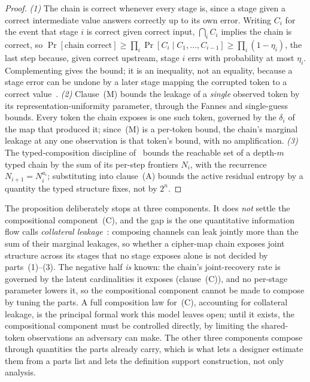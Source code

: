 \documentclass[11pt]{article}
\theoremstyle{definition}
\theoremstyle{plain}
\theoremstyle{remark}
\begin{document}
\begin{proof}
\emph{(1)} The chain is correct whenever every stage is, since a stage given a
correct intermediate value answers correctly up to its own error. Writing $C_i$
for the event that stage $i$ is correct given correct input, $\bigcap_i C_i$
implies the chain is correct, so $\Pr[\text{chain correct}] \ge \prod_{i}
\Pr[C_i \mid C_1, \ldots, C_{i-1}] \ge \prod_{i} (1 - \eta_i)$, the last step
because, given correct upstream, stage $i$ errs with probability at most
$\eta_i$. Complementing gives the bound; it is an inequality, not an equality,
because a stage error can be undone by a later stage mapping the corrupted token
to a correct value~\cite{towell2026cipher}. \emph{(2)} Clause~(M) bounds the
leakage of a \emph{single} observed token by its representation-uniformity
parameter, through the Fannes and single-guess bounds. Every token the chain
exposes is one such token, governed by the $\delta_i$ of the map that produced
it; since~(M) is a per-token bound, the chain's marginal leakage at any one
observation is that token's bound, with no amplification. \emph{(3)} The
typed-composition discipline of~\cite{towell2026algebraic} bounds the reachable
set of a depth-$m$ typed chain by the sum of its per-step frontiers $N_i$, with
the recurrence $N_{i+1} = N_i^{a_i}$; substituting into clause~(A) bounds the
active residual entropy by a quantity the typed structure fixes, not by $2^n$.
\end{proof}

The proposition deliberately stops at three components. It does \emph{not} settle
the compositional component~(C), and the gap is the one quantitative information
flow calls \emph{collateral leakage}~\cite{mciver2016collateral,%
kawamoto2016compositionality}: composing channels can leak jointly more than the
sum of their marginal leakages, so whether a cipher-map chain exposes joint
structure across its stages that no stage exposes alone is not decided by
parts~(1)--(3). The negative half \emph{is} known: the chain's joint-recovery
rate is governed by the latent cardinalities it exposes (clause~(C)), and no
per-stage parameter lowers it, so the compositional component cannot be made to
compose by tuning the parts. A full composition law for~(C), accounting for
collateral leakage, is the principal formal work this model leaves open; until it
exists, the compositional component must be controlled directly, by limiting the
shared-token observations an adversary can make. The other three components
compose through quantities the parts already carry, which is what lets a designer
estimate them from a parts list and lets the definition support construction, not
only analysis.
\end{document}
